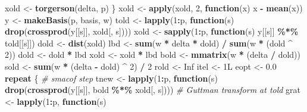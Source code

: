 \documentclass[
  12pt,
]{article}
\newenvironment{Shaded}{\begin{snugshade}}{\end{snugshade}}
\newcommand{\CommentTok}[1]{\textcolor[rgb]{0.56,0.35,0.01}{\textit{#1}}}
\newcommand{\ConstantTok}[1]{\textcolor[rgb]{0.56,0.35,0.01}{#1}}
\newcommand{\ControlFlowTok}[1]{\textcolor[rgb]{0.13,0.29,0.53}{\textbf{#1}}}
\newcommand{\DataTypeTok}[1]{\textcolor[rgb]{0.13,0.29,0.53}{#1}}
\newcommand{\DecValTok}[1]{\textcolor[rgb]{0.00,0.00,0.81}{#1}}
\newcommand{\FloatTok}[1]{\textcolor[rgb]{0.00,0.00,0.81}{#1}}
\newcommand{\FunctionTok}[1]{\textcolor[rgb]{0.13,0.29,0.53}{\textbf{#1}}}
\newcommand{\NormalTok}[1]{#1}
\newcommand{\OtherTok}[1]{\textcolor[rgb]{0.56,0.35,0.01}{#1}}
\newcommand{\SpecialCharTok}[1]{\textcolor[rgb]{0.81,0.36,0.00}{\textbf{#1}}}
\begin{document}
\begin{Shaded}
\begin{Highlighting}[]
\NormalTok{      xold }\OtherTok{\textless{}{-}} \FunctionTok{torgerson}\NormalTok{(delta, p)}
\NormalTok{    \}}
\NormalTok{    xold }\OtherTok{\textless{}{-}} \FunctionTok{apply}\NormalTok{(xold, }\DecValTok{2}\NormalTok{, }\ControlFlowTok{function}\NormalTok{(x)}
\NormalTok{      x }\SpecialCharTok{{-}} \FunctionTok{mean}\NormalTok{(x))}
\NormalTok{    y }\OtherTok{\textless{}{-}} \FunctionTok{makeBasis}\NormalTok{(p, basis, w)}
\NormalTok{    told }\OtherTok{\textless{}{-}}
      \FunctionTok{lapply}\NormalTok{(}\DecValTok{1}\SpecialCharTok{:}\NormalTok{p, }\ControlFlowTok{function}\NormalTok{(s)}
        \FunctionTok{drop}\NormalTok{(}\FunctionTok{crossprod}\NormalTok{(y[[s]], xold[, s])))}
\NormalTok{    xold }\OtherTok{\textless{}{-}} \FunctionTok{sapply}\NormalTok{(}\DecValTok{1}\SpecialCharTok{:}\NormalTok{p, }\ControlFlowTok{function}\NormalTok{(s)}
\NormalTok{      y[[s]] }\SpecialCharTok{\%*\%}\NormalTok{ told[[s]])}
\NormalTok{    dold }\OtherTok{\textless{}{-}} \FunctionTok{dist}\NormalTok{(xold)}
\NormalTok{    lbd  }\OtherTok{\textless{}{-}} \FunctionTok{sum}\NormalTok{(w }\SpecialCharTok{*}\NormalTok{ delta }\SpecialCharTok{*}\NormalTok{ dold) }\SpecialCharTok{/} \FunctionTok{sum}\NormalTok{(w }\SpecialCharTok{*}\NormalTok{ (dold }\SpecialCharTok{\^{}} \DecValTok{2}\NormalTok{))}
\NormalTok{    dold }\OtherTok{\textless{}{-}}\NormalTok{ dold }\SpecialCharTok{*}\NormalTok{ lbd}
\NormalTok{    xold }\OtherTok{\textless{}{-}}\NormalTok{ xold }\SpecialCharTok{*}\NormalTok{ lbd}
\NormalTok{    bold }\OtherTok{\textless{}{-}} \FunctionTok{mmatrix}\NormalTok{(w }\SpecialCharTok{*}\NormalTok{ (delta }\SpecialCharTok{/}\NormalTok{ dold))}
\NormalTok{    sold }\OtherTok{\textless{}{-}} \FunctionTok{sum}\NormalTok{(w }\SpecialCharTok{*}\NormalTok{ (delta }\SpecialCharTok{{-}}\NormalTok{ dold) }\SpecialCharTok{\^{}} \DecValTok{2}\NormalTok{) }\SpecialCharTok{/} \DecValTok{2}
\NormalTok{    rold }\OtherTok{\textless{}{-}} \ConstantTok{Inf}
\NormalTok{    itel }\OtherTok{\textless{}{-}} \DecValTok{1}\DataTypeTok{L}
\NormalTok{    eopt }\OtherTok{\textless{}{-}} \FloatTok{0.0}
    \ControlFlowTok{repeat}\NormalTok{ \{}
      \CommentTok{\# smacof step}
\NormalTok{      tnew }\OtherTok{\textless{}{-}}
        \FunctionTok{lapply}\NormalTok{(}\DecValTok{1}\SpecialCharTok{:}\NormalTok{p, }\ControlFlowTok{function}\NormalTok{(s)}
          \FunctionTok{drop}\NormalTok{(}\FunctionTok{crossprod}\NormalTok{(y[[s]], bold }\SpecialCharTok{\%*\%}\NormalTok{ xold[, s]))) }\CommentTok{\# Guttman transform at told}
\NormalTok{      grat }\OtherTok{\textless{}{-}}
        \FunctionTok{lapply}\NormalTok{(}\DecValTok{1}\SpecialCharTok{:}\NormalTok{p, }\ControlFlowTok{function}\NormalTok{(s)}

\end{Highlighting}
\end{Shaded}
\end{document}
